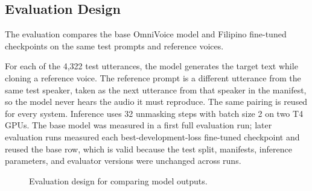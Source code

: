 \documentclass[11pt]{article}
\begin{document}
\subsection{Evaluation Design}

The evaluation compares the base OmniVoice model and Filipino fine-tuned checkpoints on the same test prompts and reference voices.

For each of the 4,322 test utterances, the model generates the target text while cloning a reference voice. The reference prompt is a different utterance from the same test speaker, taken as the next utterance from that speaker in the manifest, so the model never hears the audio it must reproduce. The same pairing is reused for every system. Inference uses 32 unmasking steps with batch size 2 on two T4 GPUs. The base model was measured in a first full evaluation run; later evaluation runs measured each best-development-loss fine-tuned checkpoint and reused the base row, which is valid because the test split, manifests, inference parameters, and evaluator versions were unchanged across runs.

\begin{figure}[H]
  \centering
  \caption{Evaluation design for comparing model outputs.}
  \label{fig:evaluation}
  \small
\end{figure}
\end{document}
